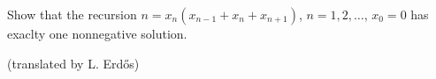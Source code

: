 Show that the recursion $n=x_n(x_{n-1}+x_n+x_{n+1})$, $n=1,2,\ldots$, $x_0=0$ has exaclty one nonnegative solution.

(translated by L. Erdős)
